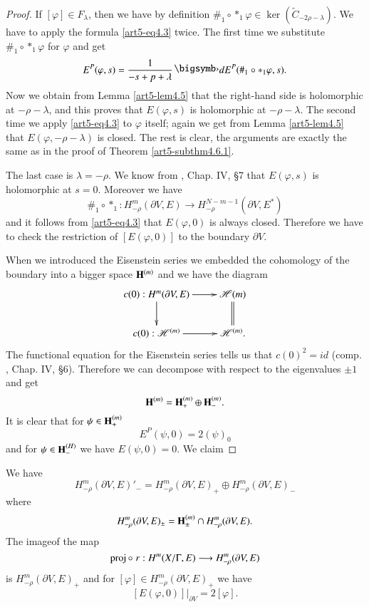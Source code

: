 \begin{proof}
If $[\varphi] \in F_\lambda$, then we have by definition $\#_1 \circ \ast_1 \varphi \in \ker (\tilde{C}_{-2\rho -\lambda})$. We have to apply the formula \eqref{art5-eq4.3} twice. The first time we substitute $\#_1 \circ \ast_1 \varphi$ for $\varphi$ and get
$$ 
E^P(\varphi, s) =\frac{1}{-s + p +\lambda} \bigdot dE^P  (\#_1 \circ \ast_1 \varphi, s). 
$$\pageoriginale 
Now we obtain from Lemma \ref{art5-lem4.5} that the right-hand side is holomorphic at $-\rho -\lambda$, and this proves that $E(\varphi, s)$ is holomorphic at $-\rho-\lambda$. The second time we apply \eqref{art5-eq4.3} to $\varphi$ itself; again we get from Lemma \eqref{art5-lem4.5} that $E(\varphi, - \rho -\lambda)$ is closed. The rest is clear, the arguments are exactly the same as in the proof of Theorem \eqref{art5-subthm4.6.1}.

The last case is $\lambda = - \rho$. We know from \cite{art5-key8}, Chap. IV, \S 7 that $E(\varphi, s)$ is holomorphic at $s =0$. Moreover we have
$$
\#_1 \circ \ast_1: H^m_{-\rho} (\partial V,E) \longrightarrow H^{N-m-1}_{-\rho} (\partial V, E^\ast)
$$
and it follows from \eqref{art5-eq4.3} that $E (\varphi, 0)$ is always closed. Therefore we have to check the restriction of $[E(\varphi, 0)]$ to the boundary $\partial V$.

When we introduced the Eisenstein series we embedded the cohomology of the boundary into a bigger space $\mathbf{H}^{(m)}$ and we have the diagram
$$ 
\xymatrix{
c(0) : H^m (\partial V, E) \ar[r] \ar[d] & \sH{(m)} \ar@{=}[d]\\
c(0) : \sH^{(m)} \ar[r] & \sH^{(m)}  .
}
$$
The functional equation for the Eisenstein series tells us that $c(0)^2 = id$ (comp. \cite{art5-key8}, Chap. IV, \S 6). Therefore we can decompose with respect to the eigenvalues $\pm 1$  and get
$$
\mathbf{H}^{(m)} = \mathbf{H}^{(m)}_+ \oplus \mathbf{H}^{(m)}_-.
$$
It is clear that for $\psi\in\mathbf{H}^{(m)}_+$
$$
E^P (\psi, 0) = 2 (\psi)_0
$$
and for $\psi \in \mathbf{H}^{(H)}_-$ we have $E (\psi, 0) =0$. We claim
\end{proof}

\begin{subtheorem}\label{art5-sublem4.6.3}
We have
$$
H^m_{-\rho} (\partial V, E)'_-= H^m_{-\rho} (\partial V, E)_+ \oplus H^m_{-\rho} (\partial V, E)_-
$$
where 
$$
H^m_{-\rho} (\partial V, E)_{\pm} =\mathbf{H}^{(m)}_{\pm} \cap H^m_{-\rho} (\partial V, E).
$$
The image\pageoriginale of the map
$$
\operatorname{proj} \circ \; r :H^m (X/ \Gamma, E) \longrightarrow H^m_{-\rho} (\partial V,E)
$$
is $H^m_{-\rho} (\partial V, E)_+$ and for $[\varphi] \in H^m_{-\rho} (\partial V, E)_+$ we have
$$
[E(\varphi, 0)] |_{\partial V} =  2 [\varphi].
$$
\end{subtheorem}

